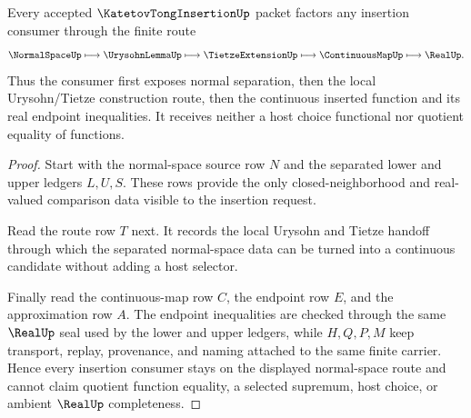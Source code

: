 \begin{theorem}
\label{thm:katetov-tong-insertion-normal-space-route}
Every accepted $\KatetovTongInsertionUp$ packet factors any insertion consumer through the finite route
$$
\NormalSpaceUp \longmapsto \UrysohnLemmaUp \longmapsto \TietzeExtensionUp \longmapsto \ContinuousMapUp \longmapsto \RealUp .
$$
Thus the consumer first exposes normal separation, then the local Urysohn/Tietze construction route, then the continuous inserted function and its real endpoint inequalities. It receives neither a host choice functional nor quotient equality of functions.
\end{theorem}
\begin{proof}
Start with the normal-space source row $N$ and the separated lower and upper ledgers $L,U,S$. These rows provide the only closed-neighborhood and real-valued comparison data visible to the insertion request.

Read the route row $T$ next. It records the local Urysohn and Tietze handoff through which the separated normal-space data can be turned into a continuous candidate without adding a host selector.

Finally read the continuous-map row $C$, the endpoint row $E$, and the approximation row $A$. The endpoint inequalities are checked through the same $\RealUp$ seal used by the lower and upper ledgers, while $H,Q,P,M$ keep transport, replay, provenance, and naming attached to the same finite carrier. Hence every insertion consumer stays on the displayed normal-space route and cannot claim quotient function equality, a selected supremum, host choice, or ambient $\RealUp$ completeness.
\end{proof}



